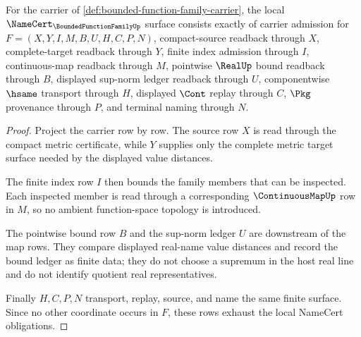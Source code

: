 \begin{theorem}
\label{thm:bounded-function-family-namecert-obligations}
For the carrier of \autoref{def:bounded-function-family-carrier}, the local $\NameCert_{\BoundedFunctionFamilyUp}$ surface consists exactly of carrier admission for $F=(X,Y,I,M,B,U,H,C,P,N)$, compact-source readback through $X$, complete-target readback through $Y$, finite index admission through $I$, continuous-map readback through $M$, pointwise $\RealUp$ bound readback through $B$, displayed sup-norm ledger readback through $U$, componentwise $\hsame$ transport through $H$, displayed $\Cont$ replay through $C$, $\Pkg$ provenance through $P$, and terminal naming through $N$.
\end{theorem}
\begin{proof}
Project the carrier row by row. The source row $X$ is read through the compact metric certificate, while $Y$ supplies only the complete metric target surface needed by the displayed value distances.

The finite index row $I$ then bounds the family members that can be inspected. Each inspected member is read through a corresponding $\ContinuousMapUp$ row in $M$, so no ambient function-space topology is introduced.

The pointwise bound row $B$ and the sup-norm ledger $U$ are downstream of the map rows. They compare displayed real-name value distances and record the bound ledger as finite data; they do not choose a supremum in the host real line and do not identify quotient real representatives.

Finally $H,C,P,N$ transport, replay, source, and name the same finite surface. Since no other coordinate occurs in $F$, these rows exhaust the local NameCert obligations.
\end{proof}

